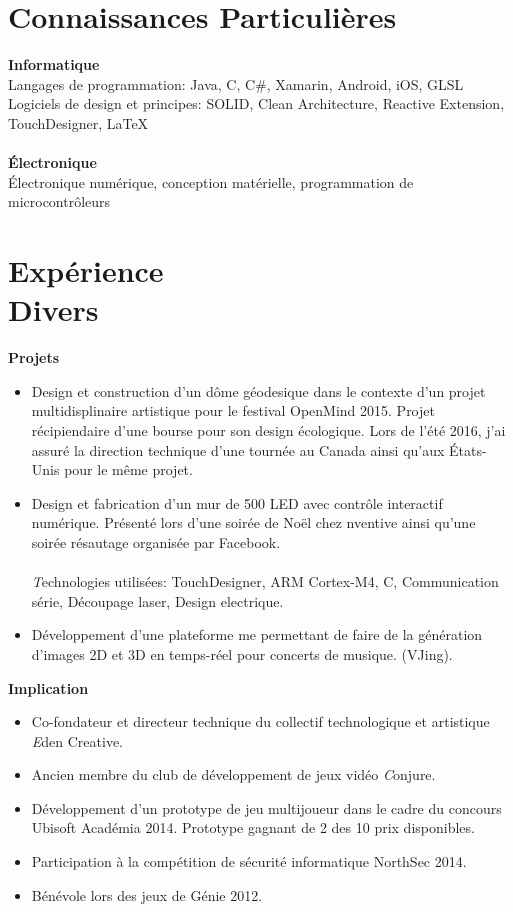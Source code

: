 \documentclass[margin,line]{res}
\begin{document}
\begin{resume}

\section{\sc Connaissances Particulières}

{\bf Informatique} \\
Langages de programmation: Java, C, C\#, Xamarin, Android, iOS, GLSL\\
Logiciels de design et principes: SOLID, Clean Architecture, Reactive Extension, TouchDesigner, \LaTeX \\\\
{\bf Électronique} \\
Électronique numérique, conception matérielle, programmation de microcontrôleurs


\section{\sc Expérience\\ Divers}
{\bf Projets}\hfill
\begin{itemize}
\item Design et construction d'un dôme géodesique dans le contexte d'un projet multidisplinaire artistique pour le festival OpenMind 2015. Projet récipiendaire d'une bourse pour son design écologique. Lors de l'été 2016, j'ai assuré la direction technique d'une tournée au Canada ainsi qu'aux États-Unis pour le même projet.
\item Design et fabrication d'un mur de 500 LED avec contrôle interactif numérique. Présenté lors d'une soirée de Noël chez nventive ainsi qu'une soirée résautage organisée par Facebook.
\\\\{\emph Technologies utilisées:} TouchDesigner, ARM Cortex-M4, C, Communication série, Découpage laser, Design electrique.
\item Développement d'une plateforme me permettant de faire de la génération d'images 2D et 3D en temps-réel pour concerts de musique. (VJing).
\end{itemize}
{\bf Implication} \hfill
\begin{itemize}
\item Co-fondateur et directeur technique du collectif technologique et artistique {\emph Eden Creative}.
\item Ancien membre du club de développement de jeux vidéo {\emph Conjure}.
\item Développement d'un prototype de jeu multijoueur dans le cadre du concours Ubisoft Académia 2014. Prototype gagnant de 2 des 10 prix disponibles.
\item Participation à la compétition de sécurité informatique NorthSec 2014.
\item Bénévole lors des jeux de Génie 2012.
\end{itemize}


\end{resume}
\end{document}
